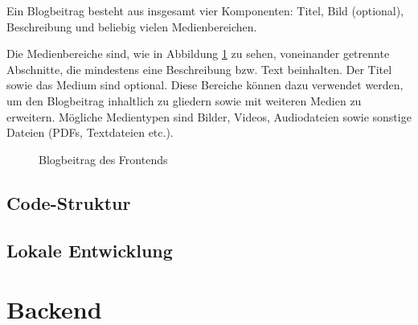 Ein Blogbeitrag besteht aus insgesamt vier Komponenten: Titel, Bild (optional), Beschreibung und beliebig vielen Medienbereichen.

Die Medienbereiche sind, wie in Abbildung \ref{fig:frontend-blogbeitrag} zu sehen, voneinander getrennte Abschnitte, die mindestens eine Beschreibung bzw. Text beinhalten. Der Titel sowie das Medium sind optional. Diese Bereiche können dazu verwendet werden, um den Blogbeitrag inhaltlich zu gliedern sowie mit weiteren Medien zu erweitern. Mögliche Medientypen sind Bilder, Videos, Audiodateien sowie sonstige Dateien (PDFs, Textdateien etc.).

\begin{figure}[H]
  \setlength{\fboxsep}{0pt}
  \setlength{\fboxrule}{0.5pt}
  \centering
  \caption[Blogbeitrag des Frontends]{Blogbeitrag des Frontends}
  \label{fig:frontend-blogbeitrag}
\end{figure}

%
%
\subsection{Code-Struktur}

%
%
\subsection{Lokale Entwicklung}

\section{Backend}
\label{sec:struktur-backend}
